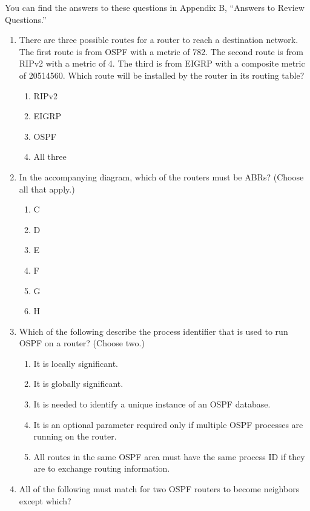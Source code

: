 You can find the answers to these questions in Appendix B, ``Answers to
Review Questions.''

\begin{enumerate}
\item
  There are three possible routes for a router to reach a destination
  network. The first route is from OSPF with a metric of 782. The second
  route is from RIPv2 with a metric of 4. The third is from EIGRP with a
  composite metric of 20514560. Which route will be installed by the
  router in its routing table?

  \begin{enumerate}
  \def\labelenumii{\Alph{enumii}.}
  \tightlist
  \item
    RIPv2
  \item
    EIGRP
  \item
    OSPF
  \item
    All three
  \end{enumerate}
\item
  In the accompanying diagram, which of the routers must be ABRs?
  (Choose all that apply.)

  \begin{figure}
  \centering
  \caption{}
  \end{figure}

  \begin{enumerate}
  \def\labelenumii{\Alph{enumii}.}
  \tightlist
  \item
    C
  \item
    D
  \item
    E
  \item
    F
  \item
    G
  \item
    H
  \end{enumerate}
\item
  \protect\hypertarget{c18.xhtmlux5cux23Page_777}{}{}Which of the
  following describe the process identifier that is used to run OSPF on
  a router? (Choose two.)

  \begin{enumerate}
  \def\labelenumii{\Alph{enumii}.}
  \tightlist
  \item
    It is locally significant.
  \item
    It is globally significant.
  \item
    It is needed to identify a unique instance of an OSPF database.
  \item
    It is an optional parameter required only if multiple OSPF processes
    are running on the router.
  \item
    All routes in the same OSPF area must have the same process ID if
    they are to exchange routing information.
  \end{enumerate}
\item
  All of the following must match for two OSPF routers to become
  neighbors except which?


\end{enumerate}
